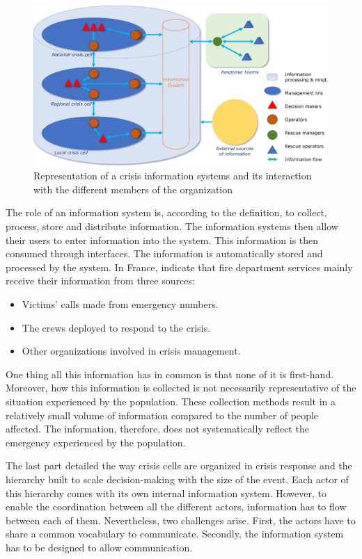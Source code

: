 \begin{figure}[htb]
    \centering
    \includegraphics[width=\textwidth]{figures/chap-1/information-system.pdf}
    \caption{Representation of a crisis information systems and its interaction with the different members of the organization}
    \label{context:information-system}
\end{figure}

The role of an information system is, according to the definition, to collect, process, store and distribute information.
The information systems then allow their users to enter information into the system.
This information is then consumed through interfaces.
The information is automatically stored and processed by the system.
In France, \textcite{morelEtudePriseDecision2010} indicate that fire department services mainly receive their information from three sources:

\begin{itemize}
    \item Victims' calls made from emergency numbers.
    \item The crews deployed to respond to the crisis.
    \item Other organizations involved in crisis management.
\end{itemize}

One thing all this information has in common is that none of it is first-hand.
Moreover, how this information is collected is not necessarily representative of the situation experienced by the population.
These collection methods result in a relatively small volume of information compared to the number of people affected.
The information, therefore, does not systematically reflect the emergency experienced by the population.

The last part detailed the way crisis cells are organized in crisis response and the hierarchy built to scale decision-making with the size of the event.
Each actor of this hierarchy comes with its own internal information system.
However, to enable the coordination between all the different actors, information has to flow between each of them.
Nevertheless, two challenges arise.
First, the actors have to share a common vocabulary to communicate.
Secondly, the information system has to be designed to allow communication.

